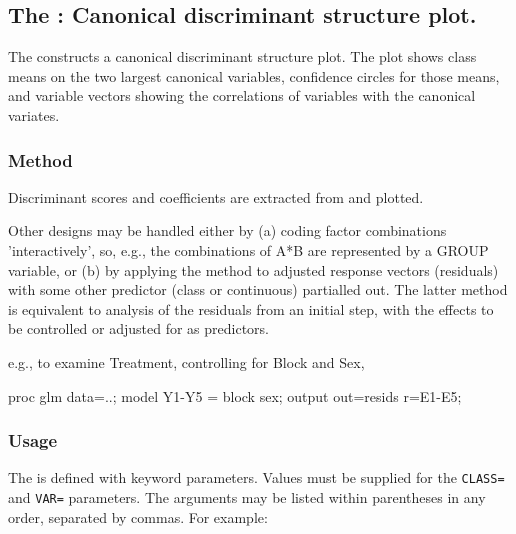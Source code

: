 
\subsection{The : Canonical discriminant structure plot.}\label{mac:canplot}

The  constructs a canonical discriminant structure
plot. The plot shows class means on the two largest canonical
variables, confidence circles for those means, and variable vectors
showing the correlations of variables with the canonical variates.

\subsubsection*{Method}

Discriminant scores and coefficients are extracted from 
and plotted.

Other designs may be handled either by (a) coding factor combinations
'interactively', so, e.g., the combinations of A*B are represented by
a GROUP variable, or (b) by applying the method to adjusted response
vectors (residuals) with some other predictor (class or continuous)
partialled out.  The latter method is equivalent to analysis of
the residuals from an initial  step, with the effects to be
controlled or adjusted for as predictors.

e.g., to examine Treatment, controlling for Block and Sex,

\begin{listing}
  proc glm data=..;
   model Y1-Y5 = block sex;
   output out=resids
      r=E1-E5;
\end{listing}
\subsubsection*{Usage}

The  is defined with keyword parameters.
Values must be supplied for the \texttt{CLASS=} and \texttt{VAR=} parameters.
The arguments may be listed within parentheses in any order, separated
by commas. For example:

\begin{listing}
\end{listing}

